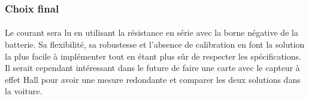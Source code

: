 	\subsubsection*{Choix final}
	\paragraph*{}
	Le courant sera lu en utilisant la résistance en série avec la borne négative de la batterie. Sa flexibilité, sa robustesse et l'absence de calibration en font la solution la plus facile à implémenter tout en étant plus sûr de respecter les spécifications. Il serait cependant intéressant dans le future de faire une carte avec le capteur à effet Hall pour avoir une mesure redondante et comparer les deux solutions dans la voiture.	
		